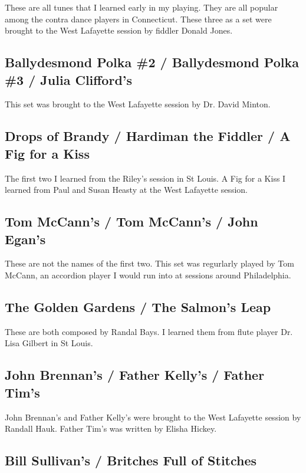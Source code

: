 \documentclass[9pt,letterpaper]{article}
\begin{document}
{These are all tunes that I learned early in my playing. They are all popular among the contra dance players in Connecticut. These three as a set were brought to the West Lafayette session by fiddler Donald Jones.

\subsection{Ballydesmond Polka \#2 / Ballydesmond Polka \#3 / Julia Clifford's}

This set was brought to the West Lafayette session by Dr. David Minton.

\subsection{Drops of Brandy / Hardiman the Fiddler / A Fig for a Kiss}

The first two I learned from the Riley's session in St Louis. A Fig for a Kiss I learned from Paul and Susan Heasty at the West Lafayette session.

\subsection{Tom McCann's / Tom McCann's / John Egan's}

These are not the names of the first two. This set was regurlarly played by Tom McCann, an accordion player I would run into at sessions around Philadelphia.

\subsection{The Golden Gardens / The Salmon's Leap}

These are both composed by Randal Bays. I learned them from flute player Dr. Lisa Gilbert in St Louis.

\subsection{John Brennan's / Father Kelly's / Father Tim's}

John Brennan's and Father Kelly's were brought to the West Lafayette session by Randall Hauk. Father Tim's was written by Elisha Hickey.

\subsection{Bill Sullivan's / Britches Full of Stitches}

}
\end{document}
